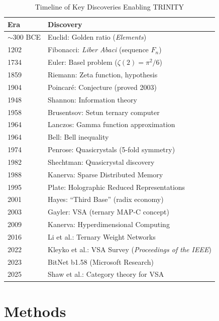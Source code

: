 \documentclass[aps,prd,preprint,superscriptaddress,showpacs,nofootinbib,longbibliography]{revtex4-2}
\begin{document}
\begin{table}[h]
\centering
\caption{Timeline of Key Discoveries Enabling TRINITY}
\small
\begin{tabular}{ll}
\toprule
Era & Discovery \\
\midrule
$\sim$300 BCE & Euclid: Golden ratio (\textit{Elements}) \\
1202 & Fibonacci: \textit{Liber Abaci} (sequence $F_n$) \\
1734 & Euler: Basel problem ($\zeta(2) = \pi^2/6$) \\
1859 & Riemann: Zeta function, hypothesis \\
1904 & Poincar\'e: Conjecture (proved 2003) \\
1948 & Shannon: Information theory \\
1958 & Brusentsov: Setun ternary computer \\
1964 & Lanczos: Gamma function approximation \\
1964 & Bell: Bell inequality \\
1974 & Penrose: Quasicrystals (5-fold symmetry) \\
1982 & Shechtman: Quasicrystal discovery \\
1988 & Kanerva: Sparse Distributed Memory \\
1995 & Plate: Holographic Reduced Representations \\
2001 & Hayes: ``Third Base'' (radix economy) \\
2003 & Gayler: VSA (ternary MAP-C concept) \\
2009 & Kanerva: Hyperdimensional Computing \\
2016 & Li et al.: Ternary Weight Networks \\
2022 & Kleyko et al.: VSA Survey (\textit{Proceedings of the IEEE}) \\
2023 & BitNet b1.58 (Microsoft Research) \\
2025 & Shaw et al.: Category theory for VSA \\
\bottomrule
\end{tabular}
\label{tab:timeline}
\end{table}

\section{Methods}
\label{sec:methods}
\end{document}
